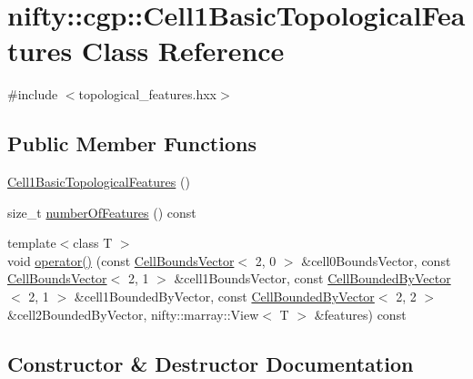 \hypertarget{classnifty_1_1cgp_1_1Cell1BasicTopologicalFeatures}{}\section{nifty\+:\+:cgp\+:\+:Cell1\+Basic\+Topological\+Features Class Reference}
\label{classnifty_1_1cgp_1_1Cell1BasicTopologicalFeatures}


{\ttfamily \#include $<$topological\+\_\+features.\+hxx$>$}

\subsection*{Public Member Functions}
\begin{DoxyCompactItemize}
\item 
\hyperlink{classnifty_1_1cgp_1_1Cell1BasicTopologicalFeatures_acf309275f4b84d463dee9bea89cd5108}{Cell1\+Basic\+Topological\+Features} ()
\item 
size\+\_\+t \hyperlink{classnifty_1_1cgp_1_1Cell1BasicTopologicalFeatures_a56a29c126efbbd38b10dce2b5ba387cb}{number\+Of\+Features} () const 
\item 
{\footnotesize template$<$class T $>$ }\\void \hyperlink{classnifty_1_1cgp_1_1Cell1BasicTopologicalFeatures_a1a4258f15fc13907751006b6aae69342}{operator()} (const \hyperlink{classnifty_1_1cgp_1_1CellBoundsVector}{Cell\+Bounds\+Vector}$<$ 2, 0 $>$ \&cell0\+Bounds\+Vector, const \hyperlink{classnifty_1_1cgp_1_1CellBoundsVector}{Cell\+Bounds\+Vector}$<$ 2, 1 $>$ \&cell1\+Bounds\+Vector, const \hyperlink{classnifty_1_1cgp_1_1CellBoundedByVector}{Cell\+Bounded\+By\+Vector}$<$ 2, 1 $>$ \&cell1\+Bounded\+By\+Vector, const \hyperlink{classnifty_1_1cgp_1_1CellBoundedByVector}{Cell\+Bounded\+By\+Vector}$<$ 2, 2 $>$ \&cell2\+Bounded\+By\+Vector, nifty\+::marray\+::\+View$<$ T $>$ \&features) const 
\end{DoxyCompactItemize}


\subsection{Constructor \& Destructor Documentation}
\hypertarget{classnifty_1_1cgp_1_1Cell1BasicTopologicalFeatures_acf309275f4b84d463dee9bea89cd5108}{}
